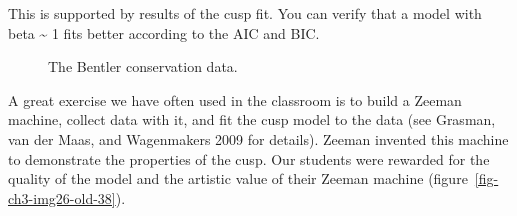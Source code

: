 \documentclass[
  a4paper,
  DIV=11,
  numbers=noendperiod,
  oneside]{scrreprt}
\begin{document}
This is supported by results of the cusp fit. You can verify that a
model with beta \textasciitilde{} 1 fits better according to the AIC and
BIC.

\begin{figure}


\caption{\label{fig-ch3-img25-old-37}The Bentler conservation data.}

\end{figure}%

A great exercise we have often used in the classroom is to build a
Zeeman machine, collect data with it, and fit the cusp model to the data
(see Grasman, van der Maas, and Wagenmakers 2009 for details). Zeeman
invented this machine to demonstrate the properties of the cusp. Our
students were rewarded for the quality of the model and the artistic
value of their Zeeman machine (figure~\ref{fig-ch3-img26-old-38}).
\end{document}
